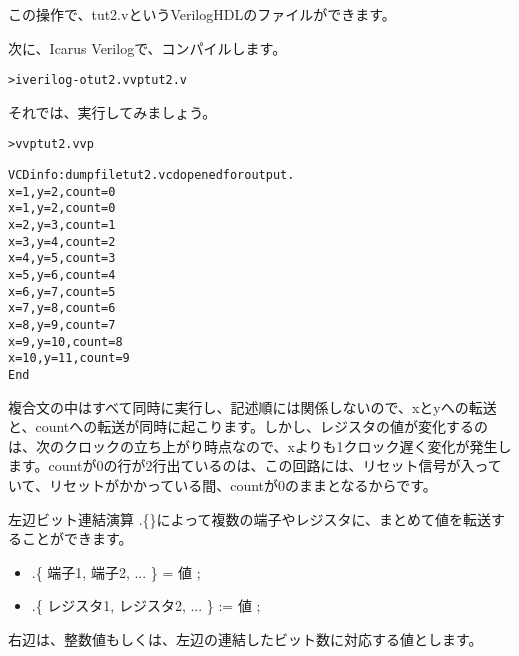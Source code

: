 この操作で、tut2.vというVerilogHDLのファイルができます。

次に、Icarus Verilogで、コンパイルします。

\begin{reviewcmd}
\begin{alltt}
\textgreater{} iverilog -o tut2.vvp tut2.v
\end{alltt}
\end{reviewcmd}

それでは、実行してみましょう。

\begin{reviewcmd}
\begin{alltt}
\textgreater{} vvp tut2.vvp

VCD info: dumpfile tut2.vcd opened for output.
x= 1,y= 2,count= 0
x= 1,y= 2,count= 0
x= 2,y= 3,count= 1
x= 3,y= 4,count= 2
x= 4,y= 5,count= 3
x= 5,y= 6,count= 4
x= 6,y= 7,count= 5
x= 7,y= 8,count= 6
x= 8,y= 9,count= 7
x= 9,y=10,count= 8
x=10,y=11,count= 9
End
\end{alltt}
\end{reviewcmd}

複合文の中はすべて同時に実行し、記述順には関係しないので、xとyへの転送と、countへの転送が同時に起こります。しかし、レジスタの値が変化するのは、次のクロックの立ち上がり時点なので、xよりも1クロック遅く変化が発生します。countが0の行が2行出ているのは、この回路には、リセット信号が入っていて、リセットがかかっている間、countが0のままとなるからです。

左辺ビット連結演算 .\{\}によって複数の端子やレジスタに、まとめて値を転送することができます。

\begin{itemize}
\item .\{ 端子1, 端子2, ... \} = 値 ;
\item .\{ レジスタ1, レジスタ2, ... \} := 値 ;
\end{itemize}

右辺は、整数値もしくは、左辺の連結したビット数に対応する値とします。
